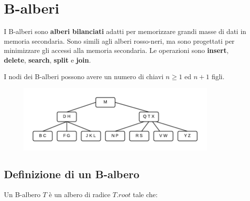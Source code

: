 \section{B-alberi}

I B-alberi sono \textbf{alberi bilanciati} adatti per memorizzare grandi masse di dati in memoria secondaria. Sono simili agli alberi rosso-neri, ma sono progettati per minimizzare gli accessi alla memoria secondaria. Le operazioni sono \textbf{insert}, \textbf{delete}, \textbf{search}, \textbf{split} e \textbf{join}.

I nodi dei B-alberi possono avere un numero di chiavi $n\ge 1$ ed $n+1$ figli.

\begin{figure}[htpd]
\centering
\includegraphics[width=100mm]{images/b-alberi1.png}
\end{figure}

\subsection{Definizione di un B-albero}

Un B-albero $T$ è un albero di radice $T.root$ tale che:


